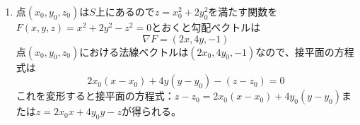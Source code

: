 \begin{souanswer}
\begin{enumerate}
\begin{align*}
    &= \frac{\pi}{12}(5\sqrt{5}- 1)
\end{align*}
    \item 点$(x_0, y_0, z_0)$は$S$上にあるので$z= x_0^2+ 2y_0^2$を満たす関数を$F(x, y, z)= x^2+ 2y^2- z^2= 0$とおくと勾配ベクトルは
\begin{equation*}
    \nabla{F}= (2x, 4y, -1)
\end{equation*}
    点$(x_0, y_0, z_0)$における法線ベクトルは$(2x_0, 4y_0, -1)$なので、接平面の方程式は
\begin{equation*}
    2x_0(x- x_0)+ 4y(y- y_0)- (z- z_0)= 0
\end{equation*}
    これを変形すると接平面の方程式：$z- z_0= 2x_0(x- x_0)+ 4y_0(y- y_0)$または$z= 2x_0x+ 4y_0y- z$が得られる。
\end{enumerate}
\end{souanswer}
